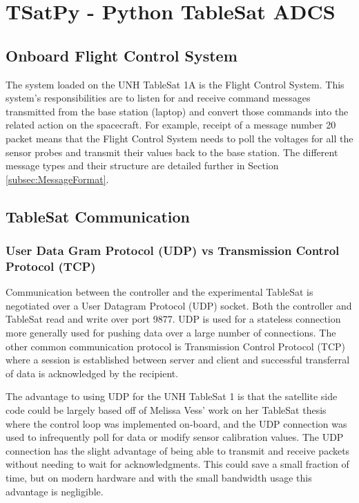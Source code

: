 
\chapter{TSatPy - Python TableSat ADCS}
\label{chap:TSatPy}

\section{Onboard Flight Control System}
\label{sec:OnbaoardFlightSystem}

The system loaded on the UNH TableSat 1A is the Flight Control System.  This system's responsibilities are to listen for and receive command messages transmitted from the base station (laptop) and convert those commands into the related action on the spacecraft.  For example, receipt of a message number 20 packet means that the Flight Control System needs to poll the voltages for all the sensor probes and transmit their values back to the base station.  The different message types and their structure are detailed further in Section \ref{subsec:MessageFormat}.

\section{TableSat Communication}
\label{sec:TableSatCommunication}

\subsection{User Data Gram Protocol (UDP) vs Transmission Control Protocol (TCP)}
\label{subsec:UDPTCP}


Communication between the controller and the experimental TableSat is
negotiated over a User Datagram Protocol (UDP) socket.  Both the
controller and TableSat read and write over port 9877.  UDP is used for
a stateless connection more generally used for pushing data over a
large number of connections.  The other common communication protocol
is Transmission Control Protocol (TCP) where a session is established
between server and client and successful transferral of data is
acknowledged by the recipient.

The advantage to using UDP for the UNH TableSat 1 is that the satellite
side code could be largely based off of Melissa Vess' work on her
TableSat thesis where the control loop was implemented on-board, and
the UDP connection was used to infrequently poll for data or modify
sensor calibration values.  The UDP connection has the slight advantage
of being able to transmit and receive packets without needing to wait for
acknowledgments.  This could save a small fraction of time, but on modern
hardware and with the small bandwidth usage this advantage is negligible.

